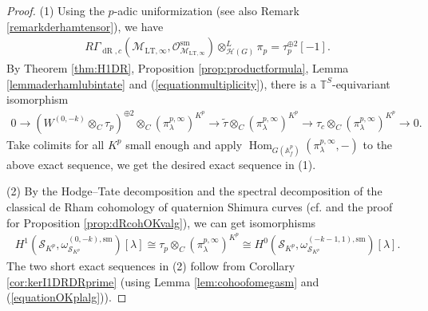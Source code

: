 \documentclass{article}
\theoremstyle{definition}
\def\calH{\mathcal{H}}
\def\calM{\mathcal{M}}
\def\calO{\mathcal{O}}
\def\calS{\mathcal{S}}
\def\bbA{\mathbb{A}}
\def\bbT{\mathbb{T}}
\DeclareMathOperator{\ox}{\otimes}
\def\isom{\cong}
\DeclareMathOperator{\Hom}{Hom}
\DeclareMathOperator{\dR}{dR}
\def\LT{\mathrm{LT}}
\def\sm{\mathrm{sm}}
\begin{document}
\begin{proof}
    (1) Using the $p$-adic uniformization (see also Remark \ref{remarkderhamtensor}), we have
    \begin{align}\label{equationderhamjacquetlanglands}
    R\Gamma_{\dR,c}(\calM_{\LT,\infty},\calO_{\calM_{\LT,\infty}}^{\sm})\ox_{\calH(G)}^L\pi_p=\tau_p^{\oplus 2}[-1].
    \end{align}    
    By Theorem \ref{thm:H1DR}, Proposition \ref{prop:productformula}, Lemma \ref{lemmaderhamlubintate} and (\ref{equationmultiplicity}), there is a $\bbT^S$-equivariant isomorphism
    \begin{align*}
        0\rightarrow(W^{(0,-k)}\ox_C \tau_p )^{\oplus 2} \otimes_C (\pi_{\lambda}^{p,\infty})^{K^p}\rightarrow \widetilde{\tau}\otimes_C (\pi_{\lambda}^{p,\infty})^{K^p}\rightarrow \tau_c\otimes_C (\pi_{\lambda}^{p,\infty})^{K^p}\rightarrow 0.
    \end{align*}
    Take colimits for all $K^p$ small enough and apply $\Hom_{G(\bbA_f^p)}(\pi_{\lambda}^{p,\infty},-)$ to the above exact sequence, we get the desired exact sequence in (1). 

    (2) By the Hodge--Tate decomposition and the spectral decomposition of the classical de Rham cohomology of quaternion Shimura curves (cf. \cite[Theorem 6.2.3]{lan2023rham} and the proof for Proposition \ref{prop:dRcohOKvalg}), we can get isomorphisms
    \begin{align*}
        H^1(\calS_{K^p},\omega^{(0,-k),\sm}_{\calS_{K^p}})[\lambda]\isom  \tau_p\otimes_C (\pi_{\lambda}^{p,\infty})^{K^p}\isom 
        H^0(\calS_{K^p},\omega^{(-k-1,1),\sm}_{\calS_{K^p}})[\lambda].
    \end{align*}
    The two short exact sequences in (2) follow from Corollary \ref{cor:kerI1DRDRprime} (using Lemma \ref{lem:cohoofomegasm} and (\ref{equationOKplalg})).
\end{proof}
\end{document}
